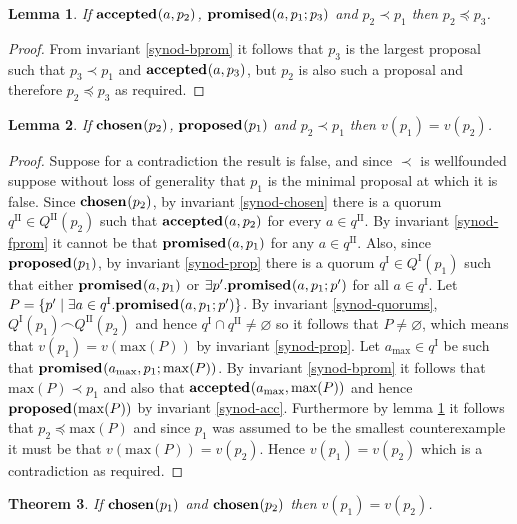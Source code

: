 \documentclass[journal]{IEEEtran}
\newtheorem{theorem}{Theorem}
\newtheorem{lemma}[theorem]{Lemma}
\begin{document}
\begin{lemma}\label{synod-acc-bprom}If $\mathbf{accepted}_{}(a,p_2)$,
$\mathbf{promised}_{}(a,p_1;p_3)$ and $p_2 \prec p_1$ then $p_2 \preceq p_3$.\end{lemma}

\begin{proof} From invariant \ref{synod-bprom} it follows that $p_3$ is the
largest proposal such that $p_3 \prec p_1$ and $\mathbf{accepted}_{}(a,p_3)$, but $p_2$ is
also such a proposal and therefore $p_2 \preceq p_3$ as required.  \end{proof}

\begin{lemma}\label{synod-lemma} If $\mathbf{chosen}_{}(p_2)$, $\mathbf{proposed}_{}(p_1)$ and $p_2
\prec p_1$ then $v(p_1) = v(p_2)$. \end{lemma}

\begin{proof}Suppose for a contradiction the result is false, and since $\prec$
is wellfounded suppose without loss of generality that $p_1$ is the minimal
proposal at which it is false.  Since $\mathbf{chosen}_{}(p_2)$, by invariant
\ref{synod-chosen} there is a quorum $q^\textrm{II} \in Q^\textrm{II}(p_2)$
such that $\mathbf{accepted}_{}(a,p_2)$ for every $a \in q^\textrm{II}$.  By invariant
\ref{synod-fprom} it cannot be that $\mathbf{promised}_{}(a,p_1)$ for any $a \in
q^\textrm{II}$.  Also, since $\mathbf{proposed}_{}(p_1)$, by invariant \ref{synod-prop}
there is a quorum $q^\textrm{I} \in Q^\textrm{I}(p_1)$ such that either
$\mathbf{promised}_{}(a,p_1)$ or $\exists p'.  \mathbf{promised}_{}(a,p_1;p')$ for all $a \in
q^\textrm{I}$.  Let $P = \{ p' \mid \exists a \in q^\textrm{I}.
\mathbf{promised}_{}(a,p_1;p') \}$.  By invariant \ref{synod-quorums},
${Q^\textrm{I}(p_1) \frown Q^\textrm{II}(p_2)}$ and hence $q^\textrm{I} \cap
q^\textrm{II} \ne \varnothing$ so it follows that $P \ne \varnothing$, which
means that $v(p_1) = v(\mathrm{max}(P))$ by invariant \ref{synod-prop}. Let
$a_{\mathrm{max}} \in q^\textrm{I}$ be such that
$\mathbf{promised}_{}(a_{\mathrm{max}},p_1;\mathrm{max}(P))$.  By invariant
\ref{synod-bprom} it follows that $\mathrm{max}(P) \prec p_1$ and also that
$\mathbf{accepted}_{}(a_{\mathrm{max}},\mathrm{max}(P))$ and hence
$\mathbf{proposed}_{}(\mathrm{max}(P))$ by invariant \ref{synod-acc}. Furthermore by lemma
\ref{synod-acc-bprom} it follows that $p_2 \preceq \mathrm{max}(P)$ and since
$p_1$ was assumed to be the smallest counterexample it must be that
$v(\mathrm{max}(P)) = v(p_2)$.  Hence $v(p_1) = v(p_2)$ which is a
contradiction as required.  \end{proof}

\begin{theorem}\label{synod-safety-theorem} If $\mathbf{chosen}_{}(p_1)$ and
$\mathbf{chosen}_{}(p_2)$ then $v(p_1) = v(p_2)$.  \end{theorem}
\end{document}
